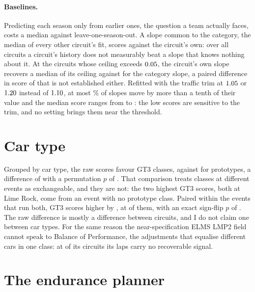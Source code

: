 \documentclass[11pt,a4paper]{article}
\begin{document}
\paragraph{Baselines.} Predicting each season only from earlier ones, the
question a team actually faces, costs a median \BasePastDiff{}
\BasePastDiffCi{} against leave-one-season-out. A slope common to the category,
the median of every other circuit's fit, scores \BaseCategoryDiff{}
\BaseCategoryDiffCi{} against the circuit's own: over all circuits a circuit's
history does not measurably beat a slope that knows nothing about it. At the
\CeilingShareN{} circuits whose ceiling exceeds $0.05{}$, the
circuit's own slope recovers a median \CeilingShareMedian{} of its ceiling
against \CeilingShareCategory{} for the category slope, a paired difference in score of
\CeilingCategoryDiff{} \CeilingCategoryDiffCi{} that is not established either.
Refitted with the traffic trim at $1.05{}$ or $1.20{}$ instead of
$1.10{}$, at most \TrimShareMoved{}\% of slopes move by more than a
tenth of their value and the median score ranges from \TrimLoroLow{} to \TrimLoroHigh{}: the
low scores are sensitive to the trim, and no setting brings them near the
threshold.

\section{Car type}
\label{app:cartype}

Grouped by car type, the raw scores favour GT3 classes, \GTThreeMean{} against
\ProtoMean{} for prototypes, a difference of \TransferDiff{}
\TransferDiffCI{} with a permutation $p$ of \TransferP{}. That comparison treats
classes at different events as exchangeable, and they are not: the two
highest GT3 scores, both at Lime Rock, come from an event with no prototype
class. Paired within the
\GtPairEvents{} events that run both, GT3 scores higher by \GtPairDiff{}
\GtPairDiffCi{}, at \GtPairHigher{} of them, with an exact sign-flip $p$ of
\GtPairP{}. The raw difference is mostly a difference between circuits, and I do
not claim one between car types. For the same reason the near-specification
ELMS LMP2 field cannot speak to Balance of Performance, the adjustments that
equalise different cars in one class: at \NLmptwoNoSignal{}
of its \NLmptwoTotal{} circuits its laps carry no recoverable signal.

\section{The endurance planner}
\label{sec:regime}
\end{document}
